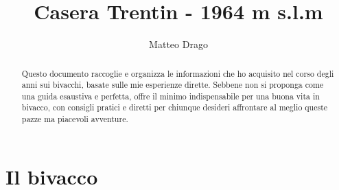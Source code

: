 \documentclass{article}
\title{\textbf{Casera Trentin - 1964 m s.l.m}}
\author{Matteo Drago}
\begin{document}
\maketitle
\thispagestyle{fancy} %

\begin{abstract}
Questo documento raccoglie e organizza le informazioni che ho acquisito nel corso degli anni sui bivacchi, basate sulle mie esperienze dirette. Sebbene non si proponga come una guida esaustiva e perfetta, offre il minimo indispensabile per una buona vita in bivacco, con consigli pratici e diretti per chiunque desideri affrontare al meglio queste pazze ma piacevoli avventure.
\end{abstract}

\section{Il bivacco}
\end{document}
